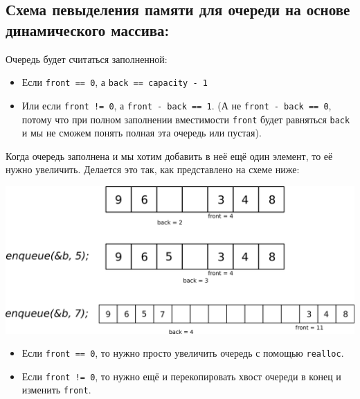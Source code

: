 \documentclass{article}
\begin{document}
\subsection*{Схема певыделения памяти для очереди на основе динамического массива:}
Очередь будет считаться заполненной: 
\begin{itemize}
\item Если \texttt{front == 0}, а \texttt{back == capacity - 1}
\item Или если \texttt{front != 0}, а \texttt{front - back == 1}. (А не \texttt{front - back == 0}, потому что при полном заполнении вместимости \texttt{front} будет равняться \texttt{back} и мы не сможем понять полная эта очередь или пустая).
\end{itemize}
 Когда очередь заполнена и мы хотим добавить в неё ещё один элемент, то её нужно увеличить. Делается это так, как представлено на схеме ниже:
\begin{center}
\includegraphics[scale=0.8]{../images/queue_dynamic.png}
\end{center}

\begin{itemize}
\item Если \texttt{front == 0}, то нужно просто увеличить очередь с помощью \texttt{realloc}.
\item Если \texttt{front != 0}, то нужно ещё и перекопировать хвост очереди в конец и изменить \texttt{front}.
\end{itemize}
\end{document}
